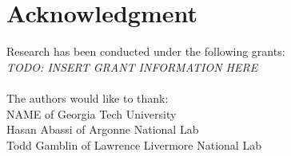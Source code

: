 \documentclass[10pt, conference, compsocconf]{IEEEtran}
\begin{document}
%







\section*{Acknowledgment}
Research has been conducted under the following grants:\\
\textit{TODO: INSERT GRANT INFORMATION HERE}\\
\\
The authors would like to thank:\\
NAME of Georgia Tech University\\
Hasan Abassi of Argonne National Lab\\
Todd Gamblin of Lawrence Livermore National Lab


\end{document}
